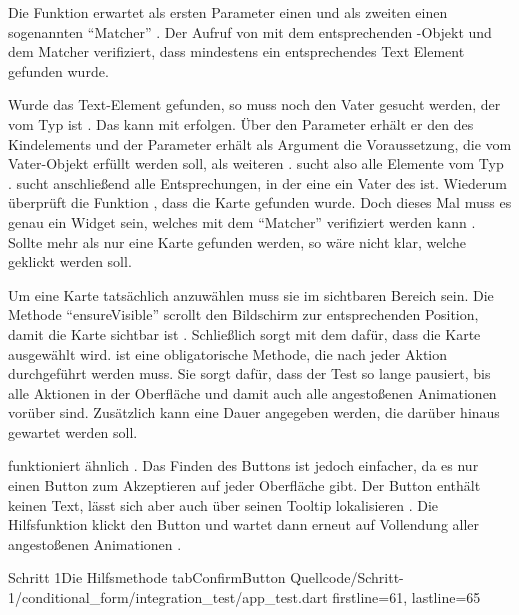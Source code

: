 Die Funktion  erwartet als ersten Parameter einen  und als zweiten einen sogenannten \enquote{Matcher} .
Der Aufruf von  mit dem entsprechenden -Objekt und dem Matcher  verifiziert, dass mindestens ein entsprechendes Text Element gefunden wurde.

Wurde das Text-Element gefunden, so muss noch den Vater gesucht werden, der vom Typ  ist .
Das kann mit  erfolgen. Über den Parameter  erhält er den  des Kindelements und der Parameter  erhält als Argument die Voraussetzung, die vom Vater-Objekt erfüllt werden soll, als weiteren .  sucht also alle Elemente vom Typ .  sucht anschließend alle Entsprechungen, in der eine  ein Vater des  ist. Wiederum überprüft die Funktion , dass die Karte gefunden wurde. Doch dieses Mal muss es genau ein Widget sein, welches mit dem \enquote{Matcher}  verifiziert werden kann . Sollte mehr als nur eine Karte gefunden werden, so wäre nicht klar, welche geklickt werden soll.

Um eine Karte tatsächlich anzuwählen muss sie im sichtbaren Bereich sein.
Die Methode \enquote{ensureVisible} scrollt den Bildschirm zur entsprechenden Position, damit die Karte sichtbar ist .
Schließlich sorgt  mit dem   dafür, dass die Karte ausgewählt wird.   ist eine obligatorische Methode, die nach jeder Aktion durchgeführt werden muss. Sie sorgt dafür, dass der Test so lange pausiert, bis alle Aktionen in der Oberfläche und damit auch alle angestoßenen Animationen vorüber sind. Zusätzlich kann eine Dauer angegeben werden, die darüber hinaus gewartet werden soll. 

 funktioniert ähnlich \Lst{\ref{lst:Schritt1HilfsmethodeTabSelectionCard}}.
Das Finden des Buttons ist jedoch einfacher, da es nur einen Button zum Akzeptieren auf jeder Oberfläche gibt.
Der Button enthält keinen Text, lässt sich aber auch über seinen Tooltip lokalisieren .
Die Hilfsfunktion klickt den Button  und wartet dann erneut auf Vollendung aller angestoßenen Animationen .

\begin{alexlisting}{Schritt 1}{Die Hilfsmethode tabConfirmButton}
  {Quellcode/Schritt-1/conditional_form/integration_test/app_test.dart}
  {firstline=61, lastline=65}
  \label{lst:Schritt1HilfsmethodeTabSelectionCard}
\end{alexlisting}

